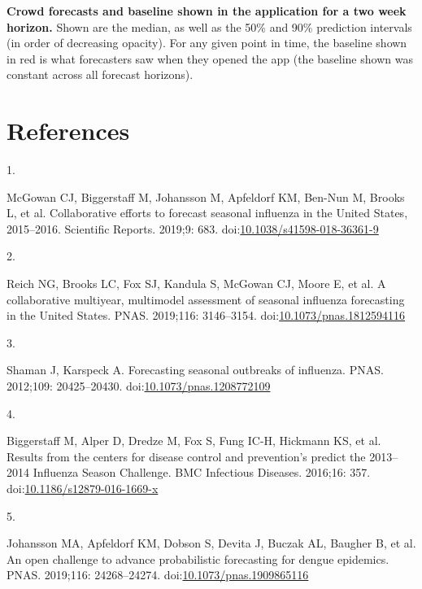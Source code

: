 \documentclass[10pt,letterpaper]{article}
\newlength{\cslhangindent}
\newlength{\csllabelwidth}
\newlength{\cslentryspacingunit} %
\newenvironment{CSLReferences}[2] %
 {%
  \setlength{\parindent}{0pt}
  \ifodd #1
  \let\oldpar\par
  \def\par{\hangindent=\cslhangindent\oldpar}
  \fi
  \setlength{\parskip}{#2\cslentryspacingunit}
 }%
 {}
\newcommand{\CSLLeftMargin}[1]{\parbox[t]{\csllabelwidth}{#1}}
\newcommand{\CSLRightInline}[1]{\parbox[t]{\linewidth - \csllabelwidth}{#1}\break}
\begin{document}
\textbf{Crowd forecasts and baseline shown in the application for a two week horizon.}
Shown are the median, as well as the 50\% and 90\% prediction intervals
(in order of decreasing opacity). For any given point in time, the
baseline shown in red is what forecasters saw when they opened the app
(the baseline shown was constant across all forecast horizons).

\clearpage

\section*{References}

\hypertarget{refs}{}
\begin{CSLReferences}{0}{0}
\leavevmode{}%
\CSLLeftMargin{1. }%
\CSLRightInline{McGowan CJ, Biggerstaff M, Johansson M, Apfeldorf KM,
Ben-Nun M, Brooks L, et al. Collaborative efforts to forecast seasonal
influenza in the {United States}, 2015--2016. Scientific Reports.
2019;9: 683.
doi:\href{https://doi.org/10.1038/s41598-018-36361-9}{10.1038/s41598-018-36361-9}}

\leavevmode{}%
\CSLLeftMargin{2. }%
\CSLRightInline{Reich NG, Brooks LC, Fox SJ, Kandula S, McGowan CJ,
Moore E, et al. A collaborative multiyear, multimodel assessment of
seasonal influenza forecasting in the {United States}. PNAS. 2019;116:
3146--3154.
doi:\href{https://doi.org/10.1073/pnas.1812594116}{10.1073/pnas.1812594116}}

\leavevmode{}%
\CSLLeftMargin{3. }%
\CSLRightInline{Shaman J, Karspeck A. Forecasting seasonal outbreaks of
influenza. PNAS. 2012;109: 20425--20430.
doi:\href{https://doi.org/10.1073/pnas.1208772109}{10.1073/pnas.1208772109}}

\leavevmode{}%
\CSLLeftMargin{4. }%
\CSLRightInline{Biggerstaff M, Alper D, Dredze M, Fox S, Fung IC-H,
Hickmann KS, et al. Results from the centers for disease control and
prevention's predict the 2013--2014 {Influenza Season Challenge}. BMC
Infectious Diseases. 2016;16: 357.
doi:\href{https://doi.org/10.1186/s12879-016-1669-x}{10.1186/s12879-016-1669-x}}

\leavevmode{}%
\CSLLeftMargin{5. }%
\CSLRightInline{Johansson MA, Apfeldorf KM, Dobson S, Devita J, Buczak
AL, Baugher B, et al. An open challenge to advance probabilistic
forecasting for dengue epidemics. PNAS. 2019;116: 24268--24274.
doi:\href{https://doi.org/10.1073/pnas.1909865116}{10.1073/pnas.1909865116}}


\end{CSLReferences}
\end{document}
